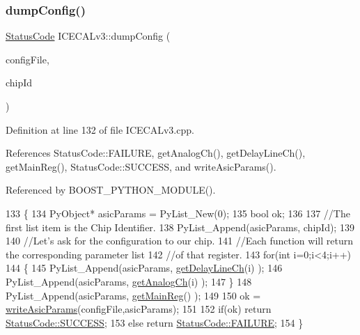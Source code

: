 \subsubsection{\texorpdfstring{dump\+Config()}{dumpConfig()}}
{\footnotesize\ttfamily \hyperlink{classStatusCode}{Status\+Code} I\+C\+E\+C\+A\+Lv3\+::dump\+Config (\begin{DoxyParamCaption}\item[{string}]{config\+File,  }\item[{Py\+Object $\ast$}]{chip\+Id }\end{DoxyParamCaption})}



Definition at line 132 of file I\+C\+E\+C\+A\+Lv3.\+cpp.



References Status\+Code\+::\+F\+A\+I\+L\+U\+RE, get\+Analog\+Ch(), get\+Delay\+Line\+Ch(), get\+Main\+Reg(), Status\+Code\+::\+S\+U\+C\+C\+E\+SS, and write\+Asic\+Params().



Referenced by B\+O\+O\+S\+T\+\_\+\+P\+Y\+T\+H\+O\+N\+\_\+\+M\+O\+D\+U\+L\+E().


\begin{DoxyCode}
133 \{
134     PyObject* asicParams = PyList\_New(0);
135     \textcolor{keywordtype}{bool} ok;
136 
137     \textcolor{comment}{//The first list item is the Chip Identifier.}
138     PyList\_Append(asicParams, chipId);
139 
140     \textcolor{comment}{//Let's ask for the configuration to our chip.}
141     \textcolor{comment}{//Each function will return the corresponding parameter list}
142     \textcolor{comment}{//of that register.}
143     \textcolor{keywordflow}{for}(\textcolor{keywordtype}{int} i=0;i<4;i++)
144     \{
145         PyList\_Append(asicParams, \hyperlink{classICECALv3_a7a1c1706a455903f42bb9a5257d94a78}{getDelayLineCh}(i) );
146         PyList\_Append(asicParams, \hyperlink{classICECALv3_a5f1414e6049a82eafdd505a88d7d0c91}{getAnalogCh}(i) );
147     \}
148     PyList\_Append(asicParams, \hyperlink{classICECALv3_a4a414d23c1e199b446dc876161338148}{getMainReg}() );
149 
150     ok = \hyperlink{classICECALv3_a9d7c33e6d113e7f721dc848d28ab44d8}{writeAsicParams}(configFile,asicParams);
151 
152     \textcolor{keywordflow}{if}(ok) \textcolor{keywordflow}{return} \hyperlink{classStatusCode_a6f565cbeadc76d14c72f047e5e85eb4badd0da38d3ba0d922efd1f4619bc37ad8}{StatusCode::SUCCESS};
153     \textcolor{keywordflow}{else}   \textcolor{keywordflow}{return} \hyperlink{classStatusCode_a6f565cbeadc76d14c72f047e5e85eb4ba3da73d4c469762eb9d3c960368252b26}{StatusCode::FAILURE};
154 \}
\end{DoxyCode}
\mbox{\label{classObject_a204a95f57818c0f811933917a30eff45}} 
